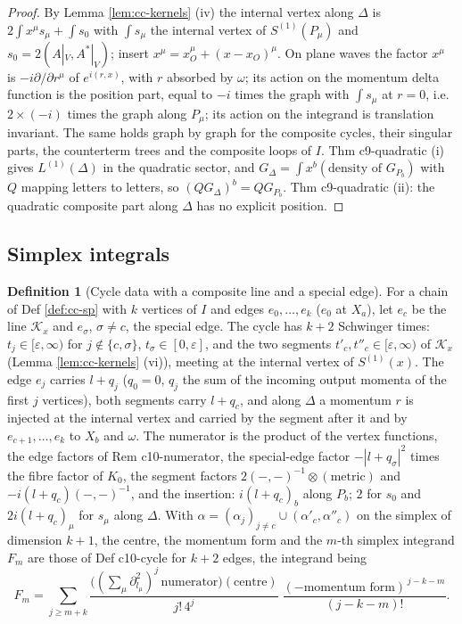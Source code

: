\documentclass[11pt]{article}
\numberwithin{equation}{section}
\theoremstyle{plain}
\theoremstyle{definition}
\newtheorem{definition}[theorem]{Definition}
\newcommand{\AV}{A|_V}
\begin{document}
\begin{proof}
By Lemma \ref{lem:cc-kernels} (iv) the internal vertex along $\Delta$ is $2\int x^\mu s_\mu+\int s_0$ with $\int s_\mu$ the internal vertex of $S^{(1)}(P_\mu)$ and $s_0=2(\AV,A^*|_V)$; insert $x^\mu=x_O^\mu+(x-x_O)^\mu$. On plane waves the factor $x^\mu$ is $-i\partial/\partial r^\mu$ of $e^{i(r,x)}$, with $r$ absorbed by $\omega$; its action on the momentum delta function is the position part, equal to $-i$ times the graph with $\int s_\mu$ at $r=0$, i.e. $2\times(-i)$ times the graph along $P_\mu$; its action on the integrand is translation invariant. The same holds graph by graph for the composite cycles, their singular parts, the counterterm trees and the composite loops of $I$. Thm c9-quadratic (i) gives $L^{(1)}(\Delta)$ in the quadratic sector, and $G_\Delta=\int x^b(\text{density of }G_{P_b})$ with $Q$ mapping letters to letters, so $(QG_\Delta)^b=QG_{P_b}$. Thm c9-quadratic (ii): the quadratic composite part along $\Delta$ has no explicit position.
\end{proof}

\subsection{Simplex integrals}

\begin{definition}[Cycle data with a composite line and a special edge]
\label{def:cc-cycle}
For a chain of Def \ref{def:cc-sp} with $k$ vertices of $I$ and edges $e_0,\dots,e_k$ ($e_0$ at $X_a$), let $e_c$ be the line $\mathcal K_x$ and $e_\sigma$, $\sigma\neq c$, the special edge. The cycle has $k+2$ Schwinger times: $t_j\in[\varepsilon,\infty)$ for $j\notin\{c,\sigma\}$, $t_\sigma\in[0,\varepsilon]$, and the two segments $t'_c,t''_c\in[\varepsilon,\infty)$ of $\mathcal K_x$ (Lemma \ref{lem:cc-kernels} (vi)), meeting at the internal vertex of $S^{(1)}(x)$. The edge $e_j$ carries $l+q_j$ ($q_0=0$, $q_j$ the sum of the incoming output momenta of the first $j$ vertices), both segments carry $l+q_c$, and along $\Delta$ a momentum $r$ is injected at the internal vertex and carried by the segment after it and by $e_{c+1},\dots,e_k$ to $X_b$ and $\omega$. The numerator is the product of the vertex functions, the edge factors of Rem c10-numerator, the special-edge factor $-|l+q_\sigma|^2$ times the fibre factor of $K_0$, the segment factors $2(-,-)^{-1}\otimes(\text{metric})$ and $-i(l+q_c)(-,-)^{-1}$, and the insertion: $i(l+q_c)_b$ along $P_b$; $2$ for $s_0$ and $2i(l+q_c)_\mu$ for $s_\mu$ along $\Delta$. With $\alpha=(\alpha_j)_{j\ne c}\cup(\alpha'_c,\alpha''_c)$ on the simplex of dimension $k+1$, the centre, the momentum form and the $m$-th simplex integrand $F_m$ are those of Def c10-cycle for $k+2$ edges, the integrand being
\[
F_m=\sum_{j\ge m+k}\frac{\big((\sum_\mu\partial^2_{l_\mu})^j\,\text{numerator}\big)(\text{centre})}{j!\,4^j}\;\frac{(-\text{momentum form})^{\,j-k-m}}{(j-k-m)!}.
\]
\end{definition}
\end{document}
